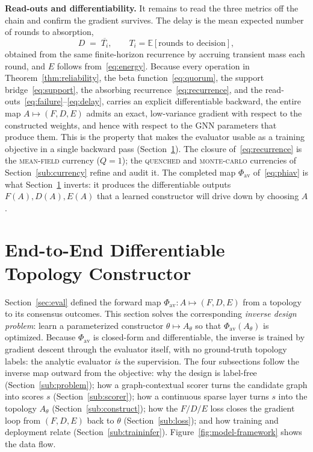 \documentclass[journal]{IEEEtran}
\newcommand{\qq}{\textsc{quenched}}
\newcommand{\mf}{\textsc{mean-field}}
\newcommand{\mc}{\textsc{monte-carlo}}
\begin{document}
\textbf{Read-outs and differentiability.} It remains to read the three metrics
off the chain and confirm the gradient survives. The delay is the mean expected
number of rounds to absorption,
\begin{equation}
  D \;=\; \overline{T_i},\qquad
  T_i = \mathbb{E}\!\left[\text{rounds to decision}\right],
  \label{eq:delay}
\end{equation}
obtained from the same finite-horizon recurrence by accruing transient mass each
round, and $E$ follows from~\eqref{eq:energy}. Because every operation in
Theorem~\ref{thm:reliability}, the beta function~\eqref{eq:quorum}, the support
bridge~\eqref{eq:support}, the absorbing recurrence~\eqref{eq:recurrence}, and
the read-outs~\eqref{eq:failure}--\eqref{eq:delay}, carries an explicit
differentiable backward, the entire map $A\mapsto(F,D,E)$ admits an exact,
low-variance gradient with respect to the constructed weights, and hence with
respect to the GNN parameters that produce them. This is the property that makes
the evaluator usable as a training objective in a single backward pass
(Section~\ref{sec:method}). The closure of~\eqref{eq:recurrence} is the \mf{}
currency ($Q{=}1$); the \qq{} and \mc{} currencies of Section~\ref{sub:currency}
refine and audit it. The completed map $\Phi_{\mathrm{av}}$ of~\eqref{eq:phiav}
is what Section~\ref{sec:method} inverts: it produces the differentiable outputs
$F(A),D(A),E(A)$ that a learned constructor will drive down by choosing $A$.

\section{End-to-End Differentiable Topology Constructor}\label{sec:method}

Section~\ref{sec:eval} defined the forward map $\Phi_{\mathrm{av}}:A\mapsto(F,D,E)$
from a topology to its consensus outcomes. This section solves the corresponding
\emph{inverse design problem}: learn a parameterized constructor
$\theta\mapsto A_\theta$ so that $\Phi_{\mathrm{av}}(A_\theta)$ is optimized.
Because $\Phi_{\mathrm{av}}$ is closed-form and differentiable, the inverse is
trained by gradient descent through the evaluator itself, with no ground-truth
topology labels: the analytic evaluator \emph{is} the supervision. The four
subsections follow the inverse map outward from the objective: why the design is
label-free (Section~\ref{sub:problem}); how a graph-contextual scorer turns the
candidate graph into scores $s$ (Section~\ref{sub:scorer}); how a continuous
sparse layer turns $s$ into the topology $A_\theta$
(Section~\ref{sub:construct}); how the $F/D/E$ loss closes the gradient loop
from $(F,D,E)$ back to $\theta$ (Section~\ref{sub:loss}); and how training and
deployment relate (Section~\ref{sub:traininfer}).
Figure~\ref{fig:model-framework} shows the data flow.
\end{document}
